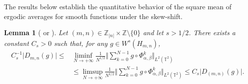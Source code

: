 \documentclass[10pt]{amsart}
\theoremstyle{definition}
\theoremstyle{plain}
\newtheorem{lemma}[definition]{Lemma}
\newcommand\TT{\mathbb{T}}
\newcommand\ZZ{\mathbb{Z}}
\begin{document}
The results below establish the quantitative behavior of the square mean of ergodic averages for smooth
functions under the skew-shift.

\begin{lemma}[{\cite[Lem.\,15]{AFU} or \cite[Lem.\,8.1]{FK}}]\label{lemma:L2bounds}
Let $(m,n)\in \ZZ_{\vert n\vert } \times \ZZ\setminus\{0\}$ and let $s>1/2$.
There exists a constant $C_s>0$ such that, for any $g \in W^s(H_{m,n})$,
\begin{equation*}
\begin{aligned}
C_s^{-1} \vert D_{m,n} (g) \vert \leq &\liminf_{N\to +\infty} \frac{ 1} {N^{1/2}} \biggl\Vert \sum_{k=0}^{N-1} g \circ \Phi_{\alpha,\beta}^k
\biggr\Vert_{L^2(\TT^2)} \\
&\leq \limsup_{N\to +\infty} \frac{ 1} {N^{1/2}} \biggl\Vert \sum_{k=0}^{N-1} g \circ \Phi_{\alpha,\beta}^k
\biggr\Vert_{L^2(\TT^2)} \leq C_s \vert D_{(m,n)} (g) \vert.
\end{aligned}
\end{equation*}
\end{lemma}
\end{document}
